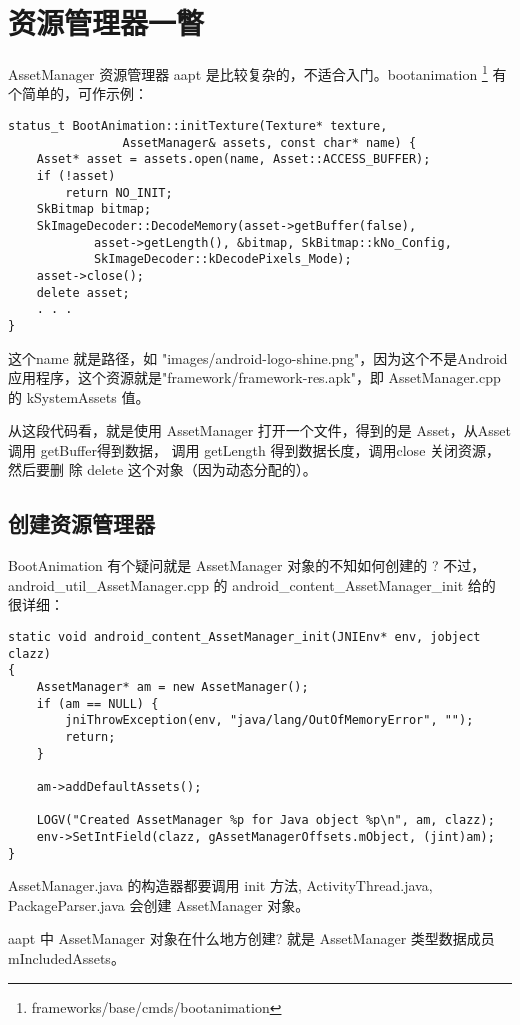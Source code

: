\documentclass[a4paper,11pt]{article}
\begin{document}
\section{资源管理器一瞥}
AssetManager 资源管理器
aapt 是比较复杂的，不适合入门。bootanimation
\footnote{frameworks/base/cmds/bootanimation} 有个简单的，可作示例：

\begin{lstlisting}
status_t BootAnimation::initTexture(Texture* texture,
                AssetManager& assets, const char* name) {
    Asset* asset = assets.open(name, Asset::ACCESS_BUFFER);
    if (!asset)
        return NO_INIT;
    SkBitmap bitmap;
    SkImageDecoder::DecodeMemory(asset->getBuffer(false),
            asset->getLength(), &bitmap, SkBitmap::kNo_Config,
            SkImageDecoder::kDecodePixels_Mode);
    asset->close();
    delete asset;
    . . .
}
\end{lstlisting}

这个name 就是路径，如 "images/android-logo-shine.png"，因为这个不是Android
应用程序，这个资源就是"framework/framework-res.apk"，即 AssetManager.cpp 的
kSystemAssets 值。

从这段代码看，就是使用 AssetManager 打开一个文件，得到的是 Asset，从Asset调用
getBuffer得到数据， 调用 getLength 得到数据长度，调用close 关闭资源，然后要删
除 delete 这个对象（因为动态分配的）。

\subsection{创建资源管理器}
BootAnimation 有个疑问就是 AssetManager 对象的不知如何创建的 ?
不过，android_util_AssetManager.cpp 的 android_content_AssetManager_init 给的
很详细：
\begin{lstlisting}
static void android_content_AssetManager_init(JNIEnv* env, jobject clazz)
{
    AssetManager* am = new AssetManager();
    if (am == NULL) {
        jniThrowException(env, "java/lang/OutOfMemoryError", "");
        return;
    }

    am->addDefaultAssets();

    LOGV("Created AssetManager %p for Java object %p\n", am, clazz);
    env->SetIntField(clazz, gAssetManagerOffsets.mObject, (jint)am);
}
\end{lstlisting}
AssetManager.java 的构造器都要调用 init 方法, ActivityThread.java, 
PackageParser.java 会创建 AssetManager 对象。

aapt 中 AssetManager 对象在什么地方创建? 就是 AssetManager 类型数据成员 
mIncludedAssets。%
\end{document}
